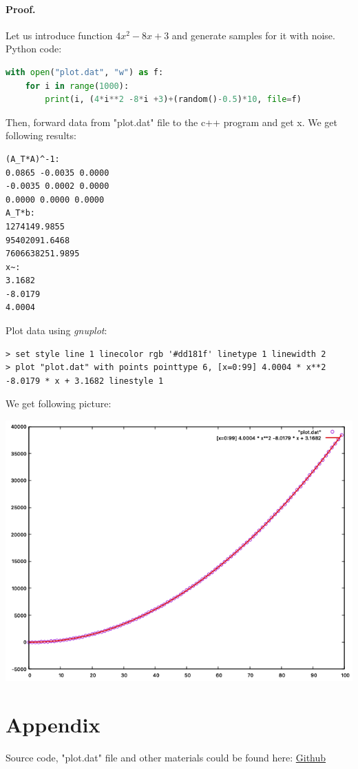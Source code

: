 \documentclass{article}
\begin{document}
\paragraph*{Proof.} Let us introduce function $4x^2-8x+3$ and generate samples for it with noise.
Python code:
\begin{lstlisting}[language=python]
with open("plot.dat", "w") as f:
    for i in range(1000):
        print(i, (4*i**2 -8*i +3)+(random()-0.5)*10, file=f)
\end{lstlisting}
Then, forward data from "plot.dat" file to the c++ program and get x.
We get following results:
\begin{lstlisting}
(A_T*A)^-1:
0.0865 -0.0035 0.0000
-0.0035 0.0002 0.0000
0.0000 0.0000 0.0000
A_T*b:
1274149.9855
95402091.6468
7606638251.9895
x~:
3.1682
-8.0179
4.0004
\end{lstlisting}
Plot data using \textit{gnuplot}:
\begin{lstlisting}
> set style line 1 linecolor rgb '#dd181f' linetype 1 linewidth 2
> plot "plot.dat" with points pointtype 6, [x=0:99] 4.0004 * x**2 -8.0179 * x + 3.1682 linestyle 1
\end{lstlisting}
We get following picture: \\
\graphicspath{ {./} }
\includegraphics[scale=0.6]{plot.png}
\section*{Appendix}
Source code, "plot.dat" file and other materials could be found here: \href{https://github.com/Dartt0n/Least-Square-Approximation-Cpp}{Github}
\end{document}
